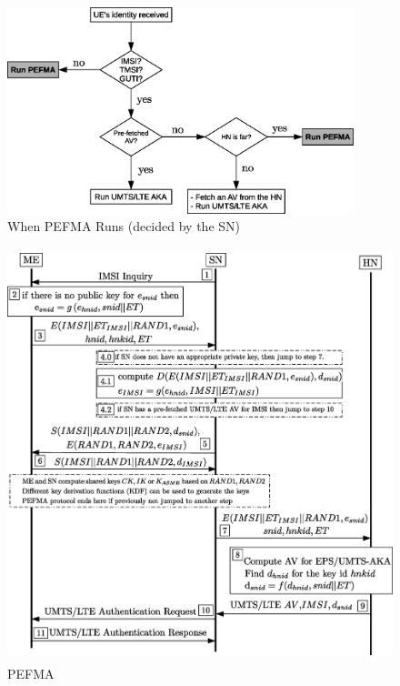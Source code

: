 \documentclass{river-journal}
\begin{document}
\begin{figure}
\begin{center}
  \includegraphics[height=6cm]{when_to_run_PEFMA.eps}
\caption{When PEFMA Runs (decided by the SN)}
\label{fig:when_pefma_runs}       %
\end{center}
\end{figure}


\begin{figure}
\begin{center}
  \includegraphics[height=12cm]{PEFMA.eps}
\caption{PEFMA}
\label{fig:PEFMA}       %
\end{center}
\end{figure}
\end{document}
